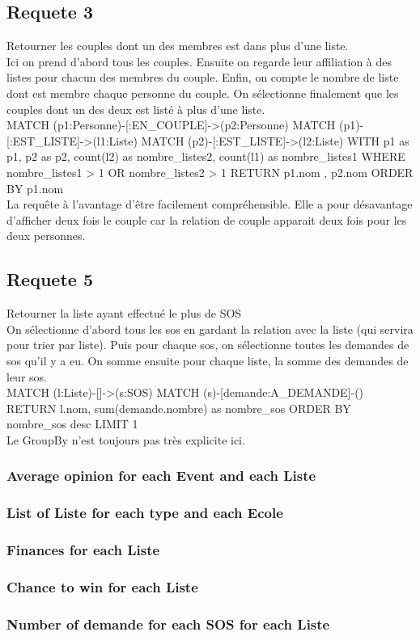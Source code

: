 \documentclass[a4paper,oneside,1pt]{article}
\begin{document}
\subsection{Requete 3}
Retourner les couples dont un des membres est dans plus d'une liste.
\\
Ici on prend d'abord tous les couples. Ensuite on regarde leur affiliation à des listes pour chacun des membres du couple. Enfin, on compte le nombre de liste dont est membre chaque personne du couple. On sélectionne finalement que les couples dont un des deux est listé à plus d'une liste.
\\
MATCH (p1:Personne)-[:EN_COUPLE]->(p2:Personne)
MATCH (p1)-[:EST_LISTE]->(l1:Liste)
MATCH (p2)-[:EST_LISTE]->(l2:Liste)
WITH p1 as p1, p2 as p2, count(l2) as nombre_listes2, count(l1) as nombre_listes1
WHERE nombre_listes1 > 1 OR nombre_listes2 > 1 
RETURN p1.nom , p2.nom
ORDER BY p1.nom
\\
La requête à l'avantage d'être facilement compréhensible. Elle a pour désavantage d'afficher deux fois le couple car la relation de couple apparait deux fois pour les deux personnes.

\subsection{Requete 5}
Retourner la liste ayant effectué le plus de SOS
\\
On sélectionne d'abord tous les sos en gardant la relation avec la liste (qui servira pour trier par liste). Puis pour chaque sos, on sélectionne toutes les demandes de sos qu'il y a eu. On somme ensuite pour chaque liste, la somme des demandes de leur sos.
\\
MATCH (l:Liste)-[]->(s:SOS)
MATCH (s)-[demande:A_DEMANDE]-()
RETURN l.nom, sum(demande.nombre) as nombre_sos
ORDER BY nombre_sos desc LIMIT 1
\\ 
Le GroupBy n'est toujours pas très explicite ici.

\subsubsection{Average opinion for each Event and each Liste} 

\subsubsection{List of Liste for each type and each Ecole}
\subsubsection{Finances for each Liste}
\subsubsection{Chance to win for each Liste}
\subsubsection{Number of demande for each SOS for each Liste}
\end{document}
